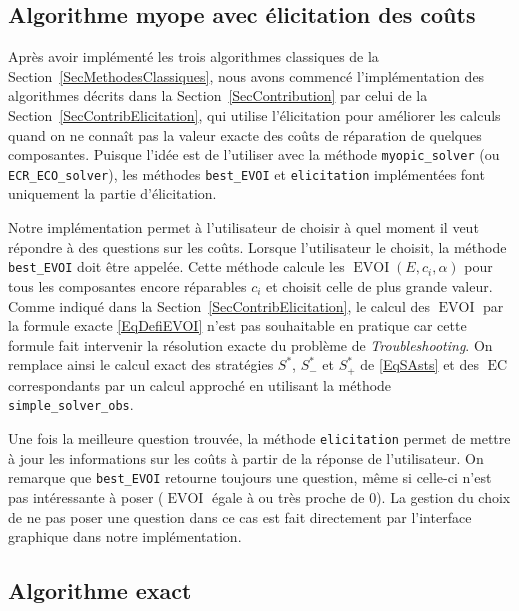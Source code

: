 \documentclass[a4paper,11pt]{article}
\theoremstyle{plain}
\theoremstyle{definition}
\DeclareMathOperator{\EC}{EC}
\DeclareMathOperator{\EVOI}{EVOI}
\begin{document}
\subsection{Algorithme myope avec élicitation des coûts}
\label{SecImplElicitation}

Après avoir implémenté les trois algorithmes classiques de la Section~\ref{SecMethodesClassiques}, nous avons commencé l'implémentation des algorithmes décrits dans la Section~\ref{SecContribution} par celui de la Section~\ref{SecContribElicitation}, qui utilise l'élicitation pour améliorer les calculs quand on ne connaît pas la valeur exacte des coûts de réparation de quelques composantes. Puisque l'idée est de l'utiliser avec la méthode \texttt{myopic\_solver} (ou \texttt{ECR\_ECO\_solver}), les méthodes \texttt{best\_EVOI} et \texttt{elicitation} implémentées font uniquement la partie d'élicitation.

Notre implémentation permet à l'utilisateur de choisir à quel moment il veut répondre à des questions sur les coûts. Lorsque l'utilisateur le choisit, la méthode \texttt{best\_EVOI} doit être appelée. Cette méthode calcule les $\EVOI(E, c_i, \alpha)$ pour tous les composantes encore réparables $c_i$ et choisit celle de plus grande valeur. Comme indiqué dans la Section~\ref{SecContribElicitation}, le calcul des $\EVOI$ par la formule exacte \eqref{EqDefiEVOI} n'est pas souhaitable en pratique car cette formule fait intervenir la résolution exacte du problème de \emph{Troubleshooting}. On remplace ainsi le calcul exact des stratégies $S^\ast$, $S_-^\ast$ et $S_+^\ast$ de \eqref{EqSAsts} et des $\EC$ correspondants par un calcul approché en utilisant la méthode \texttt{simple\_solver\_obs}.

Une fois la meilleure question trouvée, la méthode \texttt{elicitation} permet de mettre à jour les informations sur les coûts à partir de la réponse de l'utilisateur. On remarque que \texttt{best\_EVOI} retourne toujours une question, même si celle-ci n'est pas intéressante à poser ($\EVOI$ égale à ou très proche de $0$). La gestion du choix de ne pas poser une question dans ce cas est fait directement par l'interface graphique dans notre implémentation.

\subsection{Algorithme exact}
\label{SecImplExact}
\end{document}
